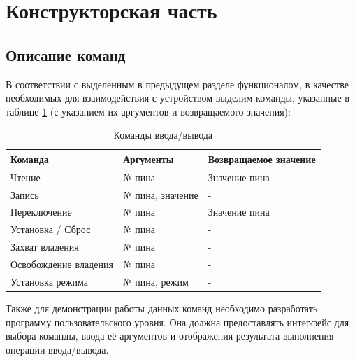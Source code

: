 \section{Конструкторская часть}

\subsection{Описание команд}
В соответствии с выделенным в предыдущем разделе функционалом, в качестве необходимых для взаимодействия с устройством выделим команды, указанные в таблице \ref{tab:commands} (с указанием их аргументов и возвращаемого значения):
\begin{table}[h] 
	\caption{Команды ввода/вывода}
	\label{tab:commands}
	\begin{tabular}{| X | X | X |}
		\hline
		
		\textbf{Команда} &
		\textbf{Аргументы} &
		\textbf{Возвращаемое значение} \\ \hline
		
		Чтение	&	
		№ пина  &
		Значение пина \\ \hline
		
		Запись	&	
		№ пина, значение  &
		- \\ \hline
		
		Переключение &	
		№ пина  &
		Значение пина \\ \hline
		
		Установка / Сброс &	
		№ пина  &
		- \\ \hline
		
		Захват владения &	
		№ пина  &
		- \\ \hline
		
		Освобождение владения &	
		№ пина  &
		- \\ \hline
		
		Установка режима &	
		№ пина, режим  &
		- \\ \hline
	\end{tabular}
\end{table}

Также для демонстрации работы данных команд необходимо разработать программу пользовательского уровня. Она должна предоставлять интерфейс для выбора команды, ввода её аргументов и отображения результата выполнения операции ввода/вывода.


